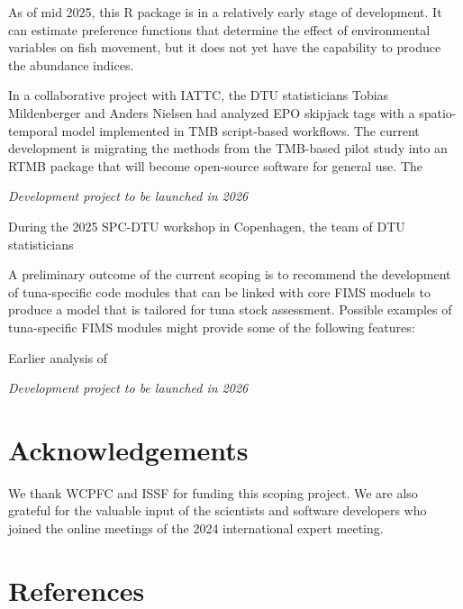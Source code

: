 \documentclass{SCreport}
\begin{document}
As of mid 2025, this R package is in a relatively early stage of development. It
can estimate preference functions that determine the effect of environmental
variables on fish movement, but it does not yet have the capability to produce
the abundance indices.

In a collaborative project with IATTC, the DTU statisticians Tobias Mildenberger
and Anders Nielsen had analyzed EPO skipjack tags with a spatio-temporal model
implemented in TMB script-based workflows. The current development is migrating
the methods from the TMB-based pilot study into an RTMB package that will become
open-source software for general use. The

\textit{Development project to be launched in 2026}

During the 2025 SPC-DTU workshop in Copenhagen, the team of DTU statisticians

A preliminary outcome of the current scoping is to recommend the development of
tuna-specific code modules that can be linked with core FIMS moduels to produce
a model that is tailored for tuna stock assessment. Possible examples of
tuna-specific FIMS modules might provide some of the following features:

Earlier
analysis of

\textit{Development project to be launched in 2026}

\section{Acknowledgements}

We thank WCPFC and ISSF for funding this scoping project. We are also grateful
for the valuable input of the scientists and software developers who joined the
online meetings of the 2024 international expert meeting.

\section{References}

\sloppy\setlength{}
\end{document}
